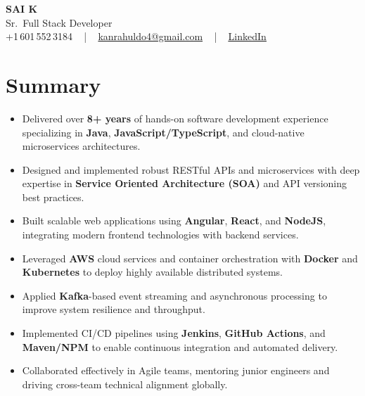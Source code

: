 \documentclass[letterpaper,11pt]{article}
\newcommand{\resumeItem}[1]{
  \item\footnotesize{
    {#1 \vspace{-2pt}}
  }
}
\newcommand{\resumeItemListStart}{\begin{itemize}[leftmargin=*]}
\newcommand{\resumeItemListEnd}{\end{itemize}\vspace{-5pt}}
\begin{document}
\begin{center}
    {\fontsize{14pt}{12pt}\selectfont \textbf{\MakeUppercase{Sai K}}}\\ \vspace{2pt}
    \fontsize{10pt}{12pt}\selectfont Sr.\ Full Stack Developer\\ \vspace{2pt}
    \fontsize{10pt}{12pt}\selectfont +1\,601\,552\,3184 ~ | ~
    \href{mailto:kanrahuldo4@gmail.com}{kanrahuldo4@gmail.com} ~ | ~
    \href{https://www.linkedin.com/in/srrrk/}{\color{blue}\underline{LinkedIn}}
    \vspace{-10pt}
\end{center}

\section{Summary}
\fontsize{9pt}{10pt}\selectfont
\resumeItemListStart
  \resumeItem{Delivered over \textbf{8+ years} of hands-on software development experience specializing in \textbf{Java}, \textbf{JavaScript/TypeScript}, and cloud-native microservices architectures.}
  \resumeItem{Designed and implemented robust RESTful APIs and microservices with deep expertise in \textbf{Service Oriented Architecture (SOA)} and API versioning best practices.}
  \resumeItem{Built scalable web applications using \textbf{Angular}, \textbf{React}, and \textbf{NodeJS}, integrating modern frontend technologies with backend services.}
  \resumeItem{Leveraged \textbf{AWS} cloud services and container orchestration with \textbf{Docker} and \textbf{Kubernetes} to deploy highly available distributed systems.}
  \resumeItem{Applied \textbf{Kafka}-based event streaming and asynchronous processing to improve system resilience and throughput.}
  \resumeItem{Implemented CI/CD pipelines using \textbf{Jenkins}, \textbf{GitHub Actions}, and \textbf{Maven/NPM} to enable continuous integration and automated delivery.}
  \resumeItem{Collaborated effectively in Agile teams, mentoring junior engineers and driving cross-team technical alignment globally.}
\resumeItemListEnd
\vspace{-6pt}

\end{document}
